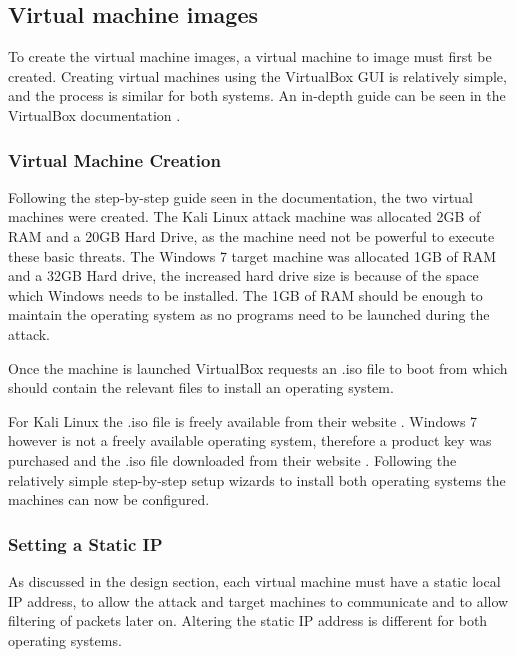 \subsection{Virtual machine images}
To create the virtual machine images, a virtual machine to image must first be created. Creating virtual machines using the VirtualBox GUI is relatively simple, and the process is similar for both systems. An in-depth guide can be seen in the VirtualBox documentation \cite{vb_docs}. 

\subsubsection{Virtual Machine Creation}
Following the step-by-step guide seen in the documentation, the two virtual machines were created. The Kali Linux attack machine was allocated 2GB of RAM and a 20GB Hard Drive, as the machine need not be powerful to execute these basic threats. The Windows 7 target machine was allocated 1GB of RAM and a 32GB Hard drive, the increased hard drive size is because of the space which Windows needs to be installed. The 1GB of RAM should be enough to maintain the operating system as no programs need to be launched during the attack.

Once the machine is launched VirtualBox requests an .iso file to boot from which should contain the relevant files to install an operating system. 

For Kali Linux the .iso file is freely available from their website \cite{kl}. Windows 7 however is not a freely available operating system, therefore a product key was purchased and the .iso file downloaded from their website \cite{w7}. Following the relatively simple step-by-step setup wizards to install both operating systems the machines can now be configured.

\subsubsection{Setting a Static IP}
As discussed in the design section, each virtual machine must have a static local IP address, to allow the attack and target machines to communicate and to allow filtering of packets later on. Altering the static IP address is different for both operating systems. 

